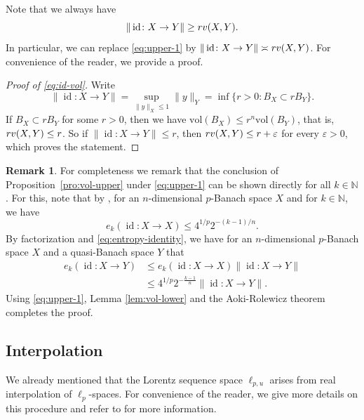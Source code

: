 \documentclass[a4paper,12pt]{article}
\theoremstyle{definition}
\newtheorem{remark}{Remark}
\newcommand{\IN}{\mathbb{N}}
\newcommand{\vol}{\mathrm{vol}}
\DeclareMathOperator{\id}{id}
\begin{document}
Note that we always have
\begin{equation}\label{eq:id-vol}
\|\id\colon X\to Y\|\ge {\rm rv}(X,Y).
\end{equation}
In particular, we can replace \eqref{eq:upper-1} by $\|\id\colon X\to Y\| \asymp  {\rm rv}(X,Y)$. For convenience of the reader, we provide a proof.

\begin{proof}[Proof of \eqref{eq:id-vol}]
Write
\[
\|\id\colon X\to Y\|
=\sup_{\|y\|_X\le 1}\|y\|_Y
=\inf\{r>0\colon B_X\subset rB_Y\}.
\]
If $B_X\subset rB_Y$ for some $r>0$, then we have $\vol(B_X)\le r^{n}\vol(B_Y)$, that is, ${\rm rv}(X,Y)\le r$. So if $\|\id\colon X\to Y\|\le r$, then ${\rm rv}(X,Y)\le r+\varepsilon$ for every $\varepsilon>0$, which proves the statement.
\end{proof}

\begin{remark}
For completeness we remark that the conclusion of Proposition~\ref{pro:vol-upper} under \eqref{eq:upper-1} can be shown directly for all $k\in\IN$. For this, note that by \cite[Lemma~2.1]{HKV16}, for an $n$-dimensional $p$-Banach space $X$ and for $k\in\IN$, we have
\begin{equation} \label{eq:entropy-identity}
e_k(\id\colon X\to X)\le 4^{1/p}2^{-(k-1)/n}.
\end{equation}
By factorization and \eqref{eq:entropy-identity}, we have for an $n$-dimensional $p$-Banach space $X$ and a quasi-Banach space $Y$ that
\begin{align*}
e_k(\id\colon X\to Y)
&\le e_k(\id\colon X\to X)\|\id\colon X\to Y\|\\
&\le 4^{1/p}2^{-\frac{k-1}{n}}\|\id\colon X\to Y\|.
\end{align*}
Using \eqref{eq:upper-1}, Lemma \ref{lem:vol-lower} and the Aoki-Rolewicz theorem completes the proof.
\end{remark}


\subsection{Interpolation}\label{sec:interpolation}

We already mentioned that the Lorentz sequence space $\ell_{p,u}$ arises from real interpolation of $\ell_p$-spaces. For convenience of the reader, we give more details on this procedure and refer to \cite{BL76} for more information. 
\end{document}
